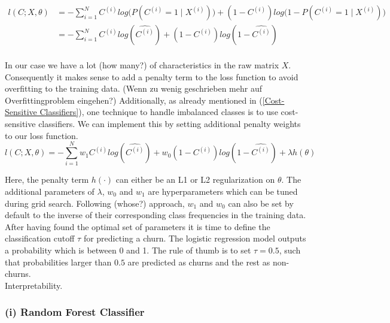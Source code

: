 \documentclass[12pt,titlepage]{article}
\begin{document}
\begin{equation} \label{logistic_log_MLE}
    \begin{aligned}
        l(C; X, \theta) & = -\sum_{i=1}^{N}C^{(i)}log\big(P(C^{(i)}=1\mid X^{(i)})\big) + (1 - C^{(i)})log\big(1 - P(C^{(i)}=1\mid  X^{(i)})\big) \\
        & = -\sum_{i=1}^{N}C^{(i)}log(\widehat{C^{(i)}}) + (1 - C^{(i)})log(1 - \widehat{C^{(i)}}) \\
    \end{aligned}
\end{equation}

In our case we have a lot (how many?) of characteristics in the raw matrix $X$. Consequently it makes sense to add a penalty term to the loss function to avoid overfitting to the training data. (Wenn zu wenig geschrieben mehr auf Overfittingproblem eingehen?) Additionally, as already mentioned in (\ref{Cost-Sensitive Classifiers}), one technique to handle imbalanced classes is to use cost-sensitive classifiers. We can implement this by setting additional penalty weights to our loss function. \\

\begin{equation} \label{loss_fct}
    l(C; X, \theta) = -\sum_{i=1}^{N}w_{1}C^{(i)}log(\widehat{C^{(i)}}) + w_{0}(1 - C^{(i)})log(1 - \widehat{C^{(i)}}) + \lambda h(\theta)
\end{equation}

Here, the penalty term $h(\cdot)$ can either be an L1 or L2 regularization on $\theta$. The additional parameters of $\lambda$, $w_{0}$ and $w_{1}$ are hyperparameters which can be tuned during grid search. Following (whose?) approach, $w_{1}$ and $w_{0}$ can also be set by default to the inverse of their corresponding class frequencies in the training data. \\
After having found the optimal set of parameters it is time to define the classification cutoff $\tau$ for predicting a churn. The logistic regression model outputs a probability which is between 0 and 1. The rule of thumb is to set $\tau = 0.5$, such that probabilities larger than $0.5$ are predicted as churns and the rest as non-churns. \\
Interpretability. \\

\subsubsection*{(i) Random Forest Classifier}
\end{document}
